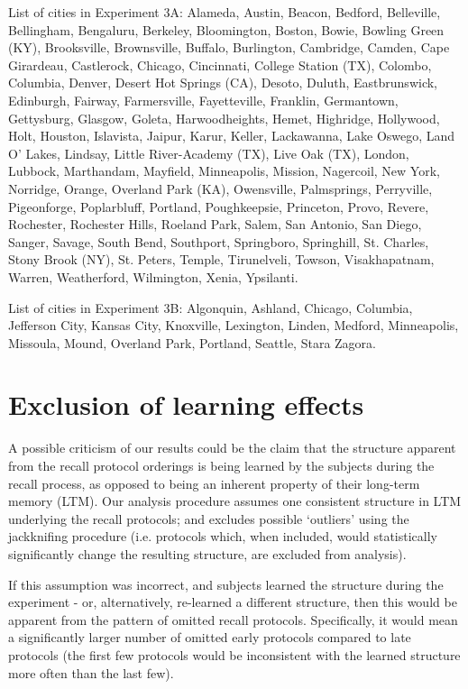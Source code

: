List of cities in Experiment 3A: \footnotesize{Alameda, Austin, Beacon, Bedford, Belleville, Bellingham, Bengaluru, Berkeley, Bloomington, Boston, Bowie, Bowling Green (KY), Brooksville, Brownsville, Buffalo, Burlington, Cambridge, Camden, Cape Girardeau, Castlerock, Chicago, Cincinnati, College Station (TX), Colombo, Columbia, Denver, Desert Hot Springs (CA), Desoto, Duluth, Eastbrunswick, Edinburgh, Fairway, Farmersville, Fayetteville, Franklin, Germantown, Gettysburg, Glasgow, Goleta, Harwoodheights, Hemet, Highridge, Hollywood, Holt, Houston, Islavista, Jaipur, Karur, Keller, Lackawanna, Lake Oswego, Land O' Lakes, Lindsay, Little River-Academy (TX), Live Oak (TX), London, Lubbock, Marthandam, Mayfield, Minneapolis, Mission, Nagercoil, New York, Norridge, Orange, Overland Park (KA), Owensville, Palmsprings, Perryville, Pigeonforge, Poplarbluff, Portland, Poughkeepsie, Princeton, Provo, Revere, Rochester, Rochester Hills, Roeland Park, Salem, San Antonio, San Diego, Sanger, Savage, South Bend, Southport, Springboro, Springhill, St. Charles, Stony Brook (NY), St. Peters, Temple, Tirunelveli, Towson, Visakhapatnam, Warren, Weatherford, Wilmington, Xenia, Ypsilanti}.

\normalsize

List of cities in Experiment 3B: \footnotesize{Algonquin, Ashland, Chicago, Columbia, Jefferson City, Kansas City, Knoxville, Lexington, Linden, Medford, Minneapolis, Missoula, Mound, Overland Park, Portland, Seattle, Stara Zagora}.

\normalsize

\section{Exclusion of learning effects}

A possible criticism of our results could be the claim that the structure apparent from the recall protocol orderings is being learned by the subjects during the recall process, as opposed to being an inherent property of their long-term memory (LTM). Our analysis procedure assumes one consistent structure in LTM underlying the recall protocols; and excludes possible `outliers' using the jackknifing procedure (i.e. protocols which, when included, would statistically significantly change the resulting structure, are excluded from analysis).

If this assumption was incorrect, and subjects learned the structure during the experiment - or, alternatively, re-learned a different structure, then this would be apparent from the pattern of omitted recall protocols. Specifically, it would mean a significantly larger number of omitted early protocols compared to late protocols (the first few protocols would be inconsistent with the learned structure more often than the last few).

